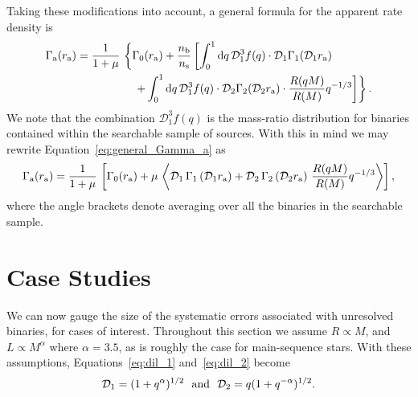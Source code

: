 \documentclass[12pt,modern]{aastex61}
\renewcommand{\a}{_{\rm a}}
\newcommand{\s}{_{\rm s}}
\renewcommand{\b}{_{\rm b}}
\begin{document}
Taking these modifications into account, a general formula for the
apparent rate density is
\begin{align}
    \notag
    \Gamma\a(r\a) &= \frac{1}{1+\mu} \,
    \left\{ \Gamma_0(r\a)+ 
    \frac{n\b}{n\s}
    \left[ \int_0^1 \mathrm{d}q \,
           \mathcal{D}_1^3 f(q)\cdot
           \mathcal{D}_1 \Gamma_1(\mathcal{D}_1r\a)\,
    \right.   
    \right. \\
    & \quad\quad\quad\quad\quad \left.\left.
    +\int_0^1 {\rm d}q\, 
         \mathcal{D}_1^3 f(q)\cdot \mathcal{D}_2
         \Gamma_2(\mathcal{D}_2r\a)\cdot
         \frac{R(qM)}{R(M)} q^{-1/3}
    \right] \right\}.
    \label{eq:general_Gamma_a}
\end{align}
We note that the combination $\mathcal{D}_1^3f(q)$ is the mass-ratio
distribution for binaries contained within the searchable sample of
sources.  With this in mind we may rewrite
Equation~\ref{eq:general_Gamma_a} as
\begin{align}
    \Gamma\a(r\a)
    =
    {1\over 1+\mu} \,
    \left[
       \Gamma_0(r\a)
       +\mu\,
       \left\langle
       \mathcal{D}_1 \, \Gamma_1\left(\mathcal{D}_1r\a\right)
       +
       {\mathcal{D}_2} \, \Gamma_2\left(\mathcal{D}_2r\a\right)
       \,
       {R(qM) \over R(M)}q^{-1/3}
       \right\rangle
    \right],
\end{align}
where the angle brackets denote averaging over all the binaries in the
searchable sample.



\section{Case Studies}
\label{sec:more_complicated}

We can now gauge the size of the systematic errors associated
with unresolved binaries, for cases of interest.  Throughout this
section we assume $R\propto M$, and $L \propto M^{\alpha}$ where
$\alpha = 3.5$, as is roughly the case for main-sequence stars.
With these assumptions, Equations~\ref{eq:dil_1} and~\ref{eq:dil_2}
become
\begin{equation}
  \mathcal{D}_1
  =  (1+q^\alpha)^{1/2}~~{\rm and}~~\mathcal{D}_2
  = q(1+q^{-\alpha})^{1/2}.
\end{equation}

\end{document}
